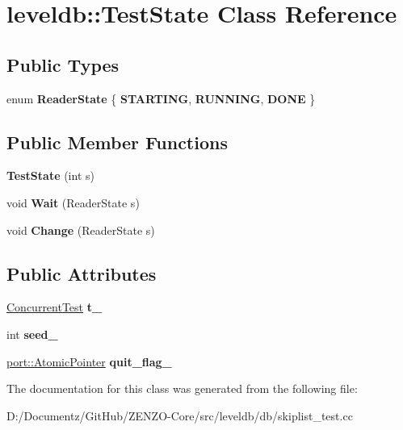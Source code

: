 \hypertarget{classleveldb_1_1_test_state}{}\section{leveldb\+::Test\+State Class Reference}
\label{classleveldb_1_1_test_state}
\subsection*{Public Types}
\begin{DoxyCompactItemize}
\item 
\mbox{\label{classleveldb_1_1_test_state_a1bf1f0a16815237ff1f29d2925d9a4ad}} 
enum {\bfseries Reader\+State} \{ {\bfseries S\+T\+A\+R\+T\+I\+NG}, 
{\bfseries R\+U\+N\+N\+I\+NG}, 
{\bfseries D\+O\+NE}
 \}
\end{DoxyCompactItemize}
\subsection*{Public Member Functions}
\begin{DoxyCompactItemize}
\item 
\mbox{\label{classleveldb_1_1_test_state_a777f2182bef5c524d580dc26ec589c2d}} 
{\bfseries Test\+State} (int s)
\item 
\mbox{\label{classleveldb_1_1_test_state_ab11f5574ad50202e18e8274e16953f0a}} 
void {\bfseries Wait} (Reader\+State s)
\item 
\mbox{\label{classleveldb_1_1_test_state_ae63a695f700220714efa0e622511740c}} 
void {\bfseries Change} (Reader\+State s)
\end{DoxyCompactItemize}
\subsection*{Public Attributes}
\begin{DoxyCompactItemize}
\item 
\mbox{\label{classleveldb_1_1_test_state_a090fd0c59fb141c4843511b4020f05e9}} 
\mbox{\hyperlink{classleveldb_1_1_concurrent_test}{Concurrent\+Test}} {\bfseries t\+\_\+}
\item 
\mbox{\label{classleveldb_1_1_test_state_aa44f519b574945b0061c88df42fd4725}} 
int {\bfseries seed\+\_\+}
\item 
\mbox{\label{classleveldb_1_1_test_state_a04e07cf69866e925db3fafd5cf9fa23f}} 
\mbox{\hyperlink{classleveldb_1_1port_1_1_atomic_pointer}{port\+::\+Atomic\+Pointer}} {\bfseries quit\+\_\+flag\+\_\+}
\end{DoxyCompactItemize}


The documentation for this class was generated from the following file\+:\begin{DoxyCompactItemize}
\item 
D\+:/\+Documentz/\+Git\+Hub/\+Z\+E\+N\+Z\+O-\/\+Core/src/leveldb/db/skiplist\+\_\+test.\+cc\end{DoxyCompactItemize}
